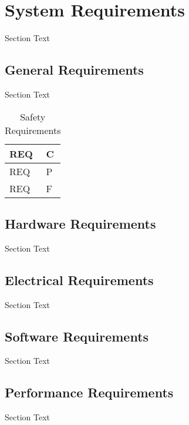 %

\setcounter{section}{2}
\section{System Requirements}
Section Text


\break
\subsection{General Requirements}
Section Text

\bgroup
\def\arraystretch{1.5}
\begin{table}[H]
\centering
\begin{tabular}{ | m{3cm} | m{13cm}| } 
\hline
REQ & C\\ 
\hline
REQ & P\\ 
\hline
REQ & F\\  
\hline
\end{tabular}
\caption{Safety Requirements}
\end{table}	

\break
\subsection{Hardware Requirements}
Section Text


\break
\subsection{Electrical Requirements}
Section Text


\break
\subsection{Software Requirements}
Section Text


\break
\subsection{Performance Requirements}
Section Text


	
%